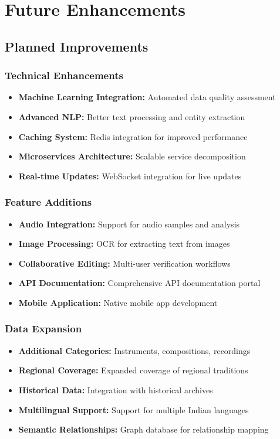 \documentclass[12pt,a4paper]{article}
\begin{document}
\section{Future Enhancements}

\subsection{Planned Improvements}

\subsubsection{Technical Enhancements}
\begin{itemize}
    \item \textbf{Machine Learning Integration:} Automated data quality assessment
    \item \textbf{Advanced NLP:} Better text processing and entity extraction
    \item \textbf{Caching System:} Redis integration for improved performance
    \item \textbf{Microservices Architecture:} Scalable service decomposition
    \item \textbf{Real-time Updates:} WebSocket integration for live updates
\end{itemize}

\subsubsection{Feature Additions}
\begin{itemize}
    \item \textbf{Audio Integration:} Support for audio samples and analysis
    \item \textbf{Image Processing:} OCR for extracting text from images
    \item \textbf{Collaborative Editing:} Multi-user verification workflows
    \item \textbf{API Documentation:} Comprehensive API documentation portal
    \item \textbf{Mobile Application:} Native mobile app development
\end{itemize}

\subsubsection{Data Expansion}
\begin{itemize}
    \item \textbf{Additional Categories:} Instruments, compositions, recordings
    \item \textbf{Regional Coverage:} Expanded coverage of regional traditions
    \item \textbf{Historical Data:} Integration with historical archives
    \item \textbf{Multilingual Support:} Support for multiple Indian languages
    \item \textbf{Semantic Relationships:} Graph database for relationship mapping
\end{itemize}
\end{document}
